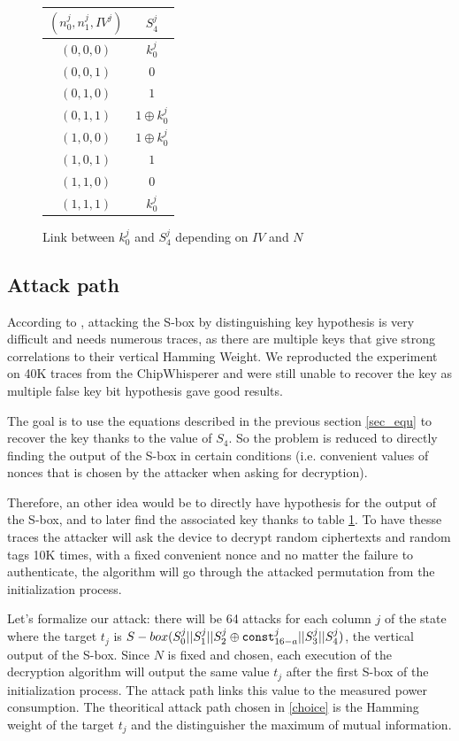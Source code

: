 \documentclass[a4paper,11pt,twocolumn]{article}
\begin{document}
		\begin{figure}[h]
			\centering
			\begin{tabular}{|c|c|}
				\hline
				$(n_0^j,n_1^j,IV^j)$&$S_4^j$\\
				\hline\hline
				$(0,0,0)$&$k_0^j$\\
				\hline
				$(0,0,1)$&$0$\\
				\hline
				$(0,1,0)$&$1$\\
				\hline
				$(0,1,1)$&$1 \oplus k_0^j$\\
				\hline
				$(1,0,0)$&$1 \oplus k_0^j$\\
				\hline
				$(1,0,1)$&$1$\\
				\hline
				$(1,1,0)$&$0$\\
				\hline
				$(1,1,1)$&$k_0^j$\\
				\hline
			\end{tabular}
			\caption{Link between $k_0^j$ and $S_4^j$ depending on $IV$ and $N$}
			\label{link_k_s4}
		\end{figure}
		
		\subsection{Attack path}
		According to \cite{cpa_analysis}, attacking the S-box by distinguishing key hypothesis is very difficult and needs numerous traces, as there are multiple keys that give strong correlations to their vertical Hamming Weight. We reproducted the experiment on 40K traces from the ChipWhisperer and were still unable to recover the key as multiple false key bit hypothesis gave good results.
		
		The goal is to use the equations described in the previous section \ref{sec_equ} to recover the key thanks to the value of $S_4$. So the problem is reduced to directly finding the output of the S-box in certain conditions (i.e. convenient values of nonces that is chosen by the attacker when asking for decryption). 
		
		Therefore, an other idea would be to directly have hypothesis for the output of the S-box, and to later find the associated key thanks to table \ref{link_k_s4}. To have thesse traces the attacker will ask the device to decrypt random ciphertexts and random tags 10K times, with a fixed convenient nonce and no matter the failure to authenticate, the algorithm will go through the attacked permutation from the initialization process.
		
		Let's formalize our attack: there will be 64 attacks for each column $j$ of the state where the target $t_j$ is $S-box(S_0^j||S_1^j||S_2^j \oplus \verb|const|_{16-a}^j||S_3^j||S_4^j)$, the vertical output of the S-box. Since $N$ is fixed and chosen, each execution of the decryption algorithm will output the same value $t_j$ after the first S-box of the initialization process. The attack path links this value to the measured power consumption. The theoritical attack path chosen in \ref{choice} is the Hamming weight of the target $t_j$ and the distinguisher the maximum of mutual information.
		
\end{document}
